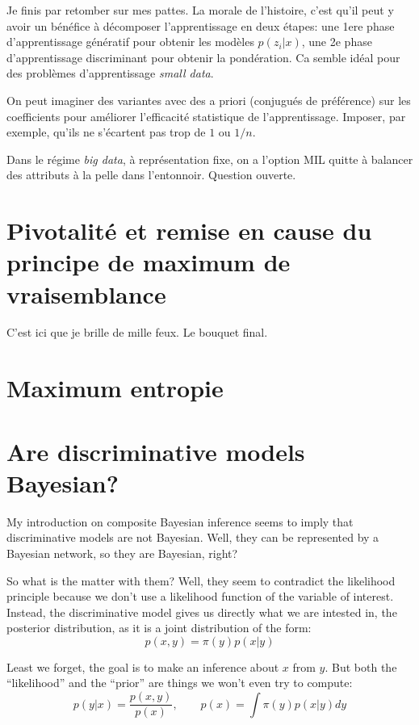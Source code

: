 \documentclass{article}
\begin{document}
Je finis par retomber sur mes pattes. La morale de l'histoire, c'est qu'il peut y avoir un b\'en\'efice \`a  d\'ecomposer l'apprentissage en deux \'etapes: une 1ere phase d'apprentissage g\'en\'eratif pour obtenir les mod\`eles $p(z_i|x)$, une 2e phase d'apprentissage discriminant pour obtenir la pond\'eration. Ca semble id\'eal pour des probl\`emes d'apprentissage {\em small data}. 

On peut imaginer des variantes avec des a priori (conjugu\'es de pr\'ef\'erence) sur les coefficients pour am\'eliorer l'efficacit\'e statistique de l'apprentissage. Imposer, par exemple, qu'ils ne s'\'ecartent pas trop de $1$ ou $1/n$. 

Dans le r\'egime {\em big data}, \`a repr\'esentation fixe, on a l'option MIL quitte \`a balancer des attributs \`a la pelle dans l'entonnoir. Question ouverte. 




\section{Pivotalit\'e et remise en cause du principe de maximum de vraisemblance}

C'est ici que je brille de mille feux. Le bouquet final.


\section{Maximum entropie}


\section{Are discriminative models Bayesian?}

My introduction on composite Bayesian inference seems to imply that discriminative models are not Bayesian. Well, they can be represented by a Bayesian network, so they are Bayesian, right? 

So what is the matter with them? Well, they seem to contradict the likelihood principle because we don't use a likelihood function of the variable of interest. Instead, the discriminative model gives us directly what we are intested in, the posterior distribution, as it is a joint distribution of the form:
$$
p(x,y) = \pi(y) p(x|y)
$$

Least we forget, the goal is to make an inference about $x$ from $y$. But both the ``likelihood'' and the ``prior'' are things we won't even try to compute: 
$$
p(y|x) = \frac{p(x,y)}{p(x)}, 
\qquad
p(x) = \int \pi(y) p(x|y) dy
$$
\end{document}
